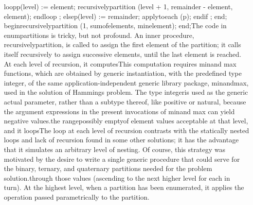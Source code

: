 \tyxtstxbf[]loop\tyxtstxendbf[]
            p(level) := element;
            recursively\Symuns[]partition (level + 1,
                                   remainder - element,
                                   element);
         \tyxtstxbf[]end\tyxtstxendbf[] \tyxtstxbf[]loop%
\tyxtstxendbf[];
      \tyxtstxbf[]else\tyxtstxendbf[]
         p(level) := remainder;
         apply\Symuns[]to\Symuns[]each (p);
      \tyxtstxbf[]end\tyxtstxendbf[] \tyxtstxbf[]if%
\tyxtstxendbf[];
   \tyxtstxbf[]end\tyxtstxendbf[];
\tyxtstxbf[]begin\tyxtstxendbf[]
   recursively\Symuns[]partition (1, sum\Symuns[]of\Symuns[]elements, min\Symuns[]element);
\tyxtstxbf[]end\tyxtstxendbf[];\Endcomp[]
\EndParbox[]
\FgEndblock[]
 The code in \tyxffmxmono[]enum\Symuns[]partitions%
\tyxffmxendmono[] is tricky, but not profound. An inner procedure,
\tyxffmxmono[]recursively\Symuns[]partition\tyxffmxendmono[], is called
to assign the first element of the partition; it calls itself recursively
to assign successive elements, until the last element is reached.
At each level of recursion, it computes\NtFoot[]\NtNtpar[]This computation
requires \tyxffmxmono[]min\tyxffmxendmono[] and \tyxffmxmono[]max%
\tyxffmxendmono[] functions, which are obtained by generic instantiation,
with the predefined type \tyxffmxmono[]integer\tyxffmxendmono[], of
the same application-independent generic library package, %
\tyxffmxmono[]min\Symuns[]and\Symuns[]max\tyxffmxendmono[], used in
the solution of Hamming\rsquo[]s problem. The type %
\tyxffmxmono[]integer\tyxffmxendmono[] is used as the generic actual
parameter, rather than a subtype thereof, like \tyxffmxmono[]positive%
\tyxffmxendmono[] or \tyxffmxmono[]natural\tyxffmxendmono[], because
the argument expressions in the present invocations of %
\tyxffmxmono[]min\tyxffmxendmono[] and \tyxffmxmono[]max%
\tyxffmxendmono[] can yield negative values.\NtEndntpar[]%
\NtEndfoot[] the range\EmDash[]possibly empty\EmDash[]of element values
acceptable at that level, and it loops\NtFoot[]\NtNtpar[]The loop
at each level of recursion contrasts with the statically nested loops
and lack of recursion found in some other solutions; it has the advantage
that it simulates an arbitrary level of nesting. Of course, this strategy
was motivated by the desire to write a single generic procedure that
could serve for the binary, ternary, and quaternary partitions needed
for the problem solution.\NtEndntpar[]\NtEndfoot[] through those values
(ascending to the next higher level for each in turn). At the highest
level, when a partition has been enumerated, it applies the operation
passed parametrically to the partition.\Endpara[]
